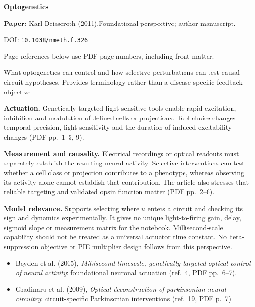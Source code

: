 

{\Large\bfseries Optogenetics\par}

\textbf{Paper:} Karl Deisseroth (2011).\quad Foundational perspective; author manuscript.\par
\href{https://doi.org/10.1038/nmeth.f.326}{DOI: \nolinkurl{10.1038/nmeth.f.326}}\par
{\footnotesize Page references below use PDF page numbers, including front matter.}

What optogenetics can control and how selective perturbations can test causal circuit hypotheses. Provides terminology rather than a disease-specific feedback objective.

\textbf{Actuation.} Genetically targeted light-sensitive tools enable rapid excitation, inhibition and modulation of defined cells or projections. Tool choice changes temporal precision, light sensitivity and the duration of induced excitability changes (PDF pp.~1--5, 9).

\textbf{Measurement and causality.} Electrical recordings or optical readouts must separately establish the resulting neural activity. Selective interventions can test whether a cell class or projection contributes to a phenotype, whereas observing its activity alone cannot establish that contribution. The article also stresses that reliable targeting and validated opsin function matter (PDF pp.~2--6).

\textbf{Model relevance.} Supports selecting where $u$ enters a circuit and checking its sign and dynamics experimentally. It gives no unique light-to-firing gain, delay, sigmoid slope or measurement matrix for the notebook. Millisecond-scale capability should not be treated as a universal actuator time constant. No beta-suppression objective or PIE multiplier design follows from this perspective.

\begin{itemize}
\item Boyden et al. (2005), \emph{Millisecond-timescale, genetically targeted optical control of neural activity}: foundational neuronal actuation (ref.~4, PDF pp.~6--7).
\item Gradinaru et al. (2009), \emph{Optical deconstruction of parkinsonian neural circuitry}: circuit-specific Parkinsonian interventions (ref.~19, PDF p.~7).
\end{itemize}


